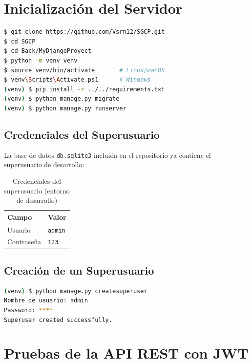 \documentclass[12pt,a4paper]{article}
\begin{document}
\section{Inicialización del Servidor}

\begin{lstlisting}[language=bash, caption=Clonando e iniciando el servidor]
$ git clone https://github.com/Vsrn12/SGCP.git
$ cd SGCP
$ cd Back/MyDjangoProyect
$ python -m venv venv
$ source venv/bin/activate       # Linux/macOS
$ venv\Scripts\Activate.ps1      # Windows
(venv) $ pip install -r ../../requirements.txt
(venv) $ python manage.py migrate
(venv) $ python manage.py runserver
\end{lstlisting}

\subsection{Credenciales del Superusuario}

La base de datos \texttt{db.sqlite3} incluida en el repositorio ya contiene
el superusuario de desarrollo:

\begin{table}[h]
\centering
\begin{tabular}{|l|l|}
\hline
\textbf{Campo} & \textbf{Valor} \\
\hline
Usuario & \texttt{admin} \\
Contrase\~na & \texttt{123} \\
\hline
\end{tabular}
\caption{Credenciales del superusuario (entorno de desarrollo)}
\end{table}

\subsection{Creación de un Superusuario}

\begin{lstlisting}[language=bash, caption=Creando un superusuario]
(venv) $ python manage.py createsuperuser
Nombre de usuario: admin
Password: ****
Superuser created successfully.
\end{lstlisting}

\section{Pruebas de la API REST con JWT}
\end{document}
